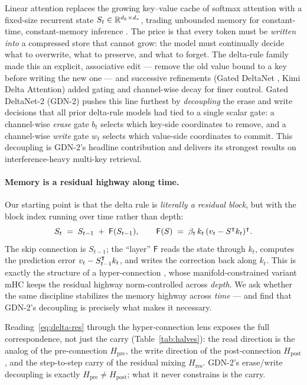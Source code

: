 \documentclass[11pt,letterpaper,logo]{yalearxiv}
\newcommand{\Hres}{H_{\mathrm{res}}}
\newcommand{\Hpre}{H_{\mathrm{pre}}}
\newcommand{\Hpost}{H_{\mathrm{post}}}
\newcommand{\Fdelta}{\mathsf{F}}               %
\begin{document}
Linear attention replaces the growing key--value cache of softmax attention with a
fixed-size recurrent state $S_t \in \mathbb{R}^{d_k \times d_v}$, trading unbounded memory for
constant-time, constant-memory inference \citep{katharopoulos2020transformers}. The price
is that every token must be \emph{written into} a compressed store that cannot grow: the
model must continually decide what to overwrite, what to preserve, and what to forget. The
delta-rule family \citep{schlag2021linear,yang2024parallelizing} made this an explicit,
associative edit --- remove the old value bound to a key before writing the new one --- and
successive refinements (Gated DeltaNet \citep{yang2024gdn}, Kimi Delta Attention) added
gating and channel-wise decay for finer control. Gated DeltaNet-2 (GDN-2)
\citep{hatamizadeh2026gdn2} pushes this line furthest by \emph{decoupling} the erase and
write decisions that all prior delta-rule models had tied to a single scalar gate: a
channel-wise \emph{erase} gate $b_t$ selects which key-side coordinates to remove, and a
channel-wise \emph{write} gate $w_t$ selects which value-side coordinates to commit. This
decoupling is GDN-2's headline contribution and delivers its strongest results on
interference-heavy multi-key retrieval.

\paragraph{Memory is a residual highway along time.} Our starting point is that the delta
rule is \emph{literally a residual block}, but with the block index running over time
rather than depth:
\begin{equation}
  S_t \;=\; S_{t-1} \;+\; \Fdelta(S_{t-1}),
  \qquad
  \Fdelta(S) \;=\; \beta_t\, k_t\,(v_t - S^{\tr} k_t)^{\tr}.
  \label{eq:delta-res}
\end{equation}
The skip connection is $S_{t-1}$; the ``layer'' $\Fdelta$ reads the state through $k_t$,
computes the prediction error $v_t - S_{t-1}^{\intercal}k_t$, and writes the correction back
along $k_t$. This is exactly the structure of a hyper-connection
\citep{zhu2024hyperconnections}, whose manifold-constrained variant mHC
\citep{deepseek2025mhc} keeps the residual highway norm-controlled across \emph{depth}. We
ask whether the same discipline stabilizes the memory highway across \emph{time} --- and
find that GDN-2's decoupling is precisely what makes it necessary.

Reading~\eqref{eq:delta-res} through the hyper-connection lens exposes the full
correspondence, not just the carry (Table~\ref{tab:halves}): the read direction is the
analog of the pre-connection $\Hpre$, the write direction of the post-connection
$\Hpost$, and the step-to-step carry of the residual mixing $\Hres$. GDN-2's erase/write
decoupling is exactly $\Hpre \neq \Hpost$; what it never constrains is the carry.
\end{document}

